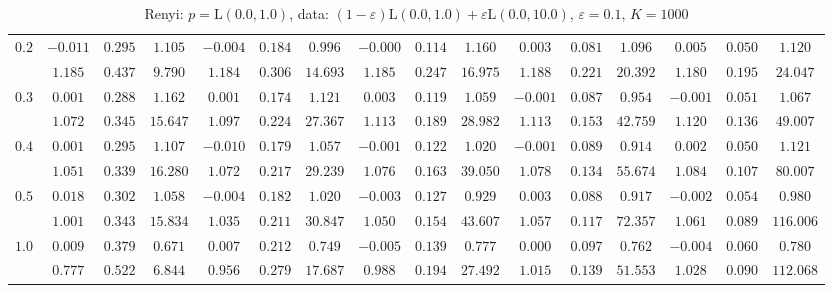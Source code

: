\begin{table}[ht]
\begin{center}
\begin{tabular}{|c|ccc|ccc|ccc|ccc|ccc|}
\hline 
$0.2$ & $ -0.011 $ & $ 0.295 $ & $ 1.105 $ & $ -0.004 $ & $ 0.184 $ & $ 0.996 $ & $ -0.000 $ & $ 0.114 $ & $ 1.160 $ & $ 0.003 $ & $ 0.081 $ & $ 1.096 $ & $ 0.005 $ & $ 0.050 $ & $ 1.120 $\\ 
 & $ 1.185 $ & $ 0.437 $ & $ 9.790 $ & $ 1.184 $ & $ 0.306 $ & $ 14.693 $ & $ 1.185 $ & $ 0.247 $ & $ 16.975 $ & $ 1.188 $ & $ 0.221 $ & $ 20.392 $ & $ 1.180 $ & $ 0.195 $ & $ 24.047 $\\ 
\hline 
$0.3$ & $ 0.001 $ & $ 0.288 $ & $ 1.162 $ & $ 0.001 $ & $ 0.174 $ & $ 1.121 $ & $ 0.003 $ & $ 0.119 $ & $ 1.059 $ & $ -0.001 $ & $ 0.087 $ & $ 0.954 $ & $ -0.001 $ & $ 0.051 $ & $ 1.067 $\\ 
 & $ 1.072 $ & $ 0.345 $ & $ 15.647 $ & $ 1.097 $ & $ 0.224 $ & $ 27.367 $ & $ 1.113 $ & $ 0.189 $ & $ 28.982 $ & $ 1.113 $ & $ 0.153 $ & $ 42.759 $ & $ 1.120 $ & $ 0.136 $ & $ 49.007 $\\ 
\hline 
$0.4$ & $ 0.001 $ & $ 0.295 $ & $ 1.107 $ & $ -0.010 $ & $ 0.179 $ & $ 1.057 $ & $ -0.001 $ & $ 0.122 $ & $ 1.020 $ & $ -0.001 $ & $ 0.089 $ & $ 0.914 $ & $ 0.002 $ & $ 0.050 $ & $ 1.121 $\\ 
 & $ 1.051 $ & $ 0.339 $ & $ 16.280 $ & $ 1.072 $ & $ 0.217 $ & $ 29.239 $ & $ 1.076 $ & $ 0.163 $ & $ 39.050 $ & $ 1.078 $ & $ 0.134 $ & $ 55.674 $ & $ 1.084 $ & $ 0.107 $ & $ 80.007 $\\ 
\hline 
$0.5$ & $ 0.018 $ & $ 0.302 $ & $ 1.058 $ & $ -0.004 $ & $ 0.182 $ & $ 1.020 $ & $ -0.003 $ & $ 0.127 $ & $ 0.929 $ & $ 0.003 $ & $ 0.088 $ & $ 0.917 $ & $ -0.002 $ & $ 0.054 $ & $ 0.980 $\\ 
 & $ 1.001 $ & $ 0.343 $ & $ 15.834 $ & $ 1.035 $ & $ 0.211 $ & $ 30.847 $ & $ 1.050 $ & $ 0.154 $ & $ 43.607 $ & $ 1.057 $ & $ 0.117 $ & $ 72.357 $ & $ 1.061 $ & $ 0.089 $ & $ 116.006 $\\ 
\hline 
$1.0$ & $ 0.009 $ & $ 0.379 $ & $ 0.671 $ & $ 0.007 $ & $ 0.212 $ & $ 0.749 $ & $ -0.005 $ & $ 0.139 $ & $ 0.777 $ & $ 0.000 $ & $ 0.097 $ & $ 0.762 $ & $ -0.004 $ & $ 0.060 $ & $ 0.780 $\\ 
 & $ 0.777 $ & $ 0.522 $ & $ 6.844 $ & $ 0.956 $ & $ 0.279 $ & $ 17.687 $ & $ 0.988 $ & $ 0.194 $ & $ 27.492 $ & $ 1.015 $ & $ 0.139 $ & $ 51.553 $ & $ 1.028 $ & $ 0.090 $ & $ 112.068 $\\ 
\hline 
\end{tabular}
\caption{Renyi: $p = \mathrm{L}(0.0,1.0)$, data: $(1-\varepsilon)\mathrm{L}(0.0,1.0) + \varepsilon \mathrm{L}(0.0,10.0)$, $\varepsilon =  0.1$, $K = 1000$} 
\end{center}
\end{table}
